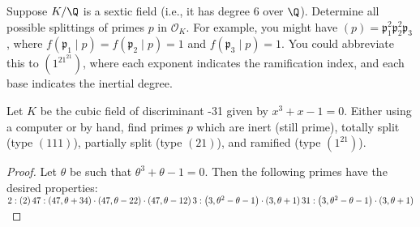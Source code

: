 \documentclass[10pt]{amsart}
\begin{document}
\begin{thm}
  \newcommand{\fp}{\mathfrak{p}}
  Suppose $K/\Q$ is a sextic field (i.e., it has degree 6 over $\Q$). Determine all possible splittings of primes $p$ in $\mathcal{O}_K$.
  For example, you might have $(p) = \fp_1^2\fp_2^2\fp_3$, where $f(\fp_1 \mid p) = f(\fp_2 \mid p) = 1$ and $f(\fp_3 \mid p) = 1$. 
  You could abbreviate this to $(1^21^21)$, where each exponent indicates the ramification index, and each base indicates the inertial degree.
\end{thm}

\begin{thm}
  Let $K$ be the cubic field of discriminant -31 given by $x^3 + x − 1 = 0$. 
  Either using a computer or by hand, find primes $p$ which are inert (still prime), totally split (type $(111)$), partially split (type $(21)$), and ramified (type $(1^21)$).
  \begin{proof}
    Let $\theta$ be such that $\theta^3 + \theta - 1 = 0$.
    Then the following primes have the desired properties:\\
    $2 : \left(2\right) \\
    47 : \left(47, \theta + 34\right) \cdot \left(47, \theta - 22\right) \cdot \left(47, \theta - 12\right)\\
    3 : \left(3, \theta^{2} - \theta - 1\right) \cdot \left(3, \theta + 1\right)\\
    31 : \left(3, \theta^{2} - \theta - 1\right) \cdot \left(3, \theta + 1\right)$
  \end{proof}
\end{thm}
\end{document}
